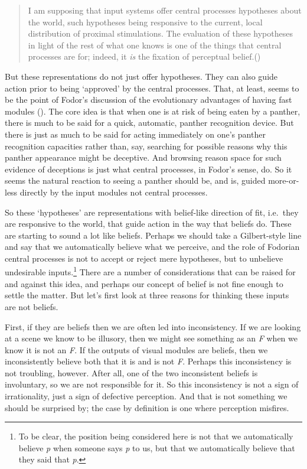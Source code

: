 \documentclass[
  11pt,
  letterpaper,
  DIV=11,
  numbers=noendperiod,
  twoside]{scrartcl}
\begin{document}
\begin{quote}
I am supposing that input systems offer central processes hypotheses
about the world, such hypotheses being responsive to the current, local
distribution of proximal stimulations. The evaluation of these
hypotheses in light of the rest of what one knows is one of the things
that central processes are for; indeed, it \emph{is} the fixation of
perceptual belief.()
\end{quote}

But these representations do not just offer hypotheses. They can also
guide action prior to being `approved' by the central processes. That,
at least, seems to be the point of Fodor's discussion of the
evolutionary advantages of having fast modules
(). The core idea is that
when one is at risk of being eaten by a panther, there is much to be
said for a quick, automatic, panther recognition device. But there is
just as much to be said for acting immediately on one's panther
recognition capacities rather than, say, searching for possible reasons
why this panther appearance might be deceptive. And browsing reason
space for such evidence of deceptions is just what central processes, in
Fodor's sense, do. So it seems the natural reaction to seeing a panther
should be, and is, guided more-or-less directly by the input modules not
central processes.

So these `hypotheses' are representations with belief-like direction of
fit, i.e.~they are responsive to the world, that guide action in the way
that beliefs do. These are starting to sound a lot like beliefs. Perhaps
we should take a Gilbert-style line and say that we automatically
believe what we perceive, and the role of Fodorian central processes is
not to accept or reject mere hypotheses, but to unbelieve undesirable
inputs.\footnote{To be clear, the position being considered here is not
  that we automatically believe \emph{p} when someone says \emph{p} to
  us, but that we automatically believe that they said that \emph{p}.}
There are a number of considerations that can be raised for and against
this idea, and perhaps our concept of belief is not fine enough to
settle the matter. But let's first look at three reasons for thinking
these inputs are not beliefs.

First, if they are beliefs then we are often led into inconsistency. If
we are looking at a scene we know to be illusory, then we might see
something as an \emph{F} when we know it is not an \emph{F}. If the
outputs of visual modules are beliefs, then we inconsistently believe
both that it is and is not \emph{F}. Perhaps this inconsistency is not
troubling, however. After all, one of the two inconsistent beliefs is
involuntary, so we are not responsible for it. So this inconsistency is
not a sign of irrationality, just a sign of defective perception. And
that is not something we should be surprised by; the case by definition
is one where perception misfires.
\end{document}
